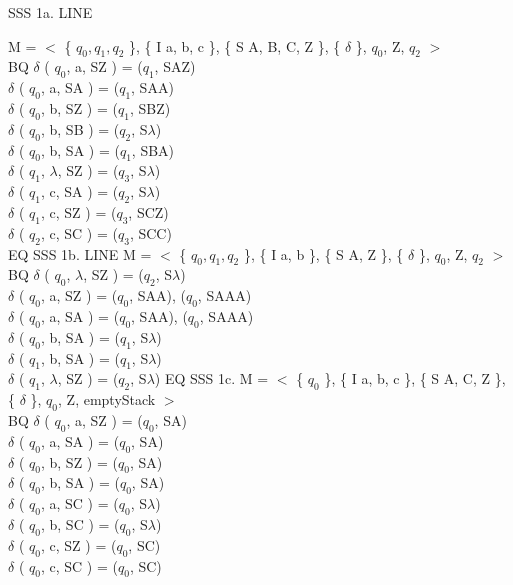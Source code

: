 SSS 1a.
LINE

M = $<$ \{ $q_0, q_1, q_2$ \}, \{ I{ a, b, c }\}, \{ S{ A, B, C, Z }\}, \{ $\delta$ \}, $q_0$, Z, $q_2$ $>$ \\
BQ
$\delta$ ( $q_0$, a, S{Z} ) = ($q_1$, S{AZ}) \\
$\delta$ ( $q_0$, a, S{A} ) = ($q_1$, S{AA}) \\
$\delta$ ( $q_0$, b, S{Z} ) = ($q_1$, S{BZ}) \\
$\delta$ ( $q_0$, b, S{B} ) = ($q_2$, S{$\lambda$}) \\
$\delta$ ( $q_0$, b, S{A} ) = ($q_1$, S{BA}) \\
$\delta$ ( $q_1$, $\lambda$, S{Z} ) = ($q_3$, S{$\lambda$}) \\
$\delta$ ( $q_1$, c, S{A} ) = ($q_2$, S{$\lambda$}) \\
$\delta$ ( $q_1$, c, S{Z} ) = ($q_3$, S{CZ}) \\
$\delta$ ( $q_2$, c, S{C} ) = ($q_3$, S{CC}) \\
EQ
SSS 1b. 
LINE
M = $<$ \{ $q_0, q_1, q_2$ \}, \{ I{ a, b }\}, \{ S{ A, Z }\}, \{ $\delta$ \}, $q_0$, Z, $q_2$ $>$ \\
BQ
$\delta$ ( $q_0$, $\lambda$, S{Z} ) = ($q_2$, S{$\lambda$}) \\
$\delta$ ( $q_0$, a, S{Z} ) = ($q_0$, S{AA}), ($q_0$, S{AAA}) \\
$\delta$ ( $q_0$, a, S{A} ) = ($q_0$, S{AA}), ($q_0$, S{AAA})\\
$\delta$ ( $q_0$, b, S{A} ) = ($q_1$, S{$\lambda$}) \\
$\delta$ ( $q_1$, b, S{A} ) = ($q_1$, S{$\lambda$}) \\
$\delta$ ( $q_1$, $\lambda$, S{Z} ) = ($q_2$, S{$\lambda$})
EQ
SSS 1c.
M = $<$ \{ $q_0$ \}, \{ I{ a, b, c }\}, \{ S{ A, C, Z }\}, \{ $\delta$ \}, $q_0$, Z, emptyStack $>$ \\
BQ
$\delta$ ( $q_0$, a, S{Z} ) = ($q_0$, S{A}) \\
$\delta$ ( $q_0$, a, S{A} ) = ($q_0$, S{A}) \\
$\delta$ ( $q_0$, b, S{Z} ) = ($q_0$, S{A}) \\
$\delta$ ( $q_0$, b, S{A} ) = ($q_0$, S{A}) \\
$\delta$ ( $q_0$, a, S{C} ) = ($q_0$, S{$\lambda$}) \\
$\delta$ ( $q_0$, b, S{C} ) = ($q_0$, S{$\lambda$}) \\
$\delta$ ( $q_0$, c, S{Z} ) = ($q_0$, S{C}) \\
$\delta$ ( $q_0$, c, S{C} ) = ($q_0$, S{C}) \\
